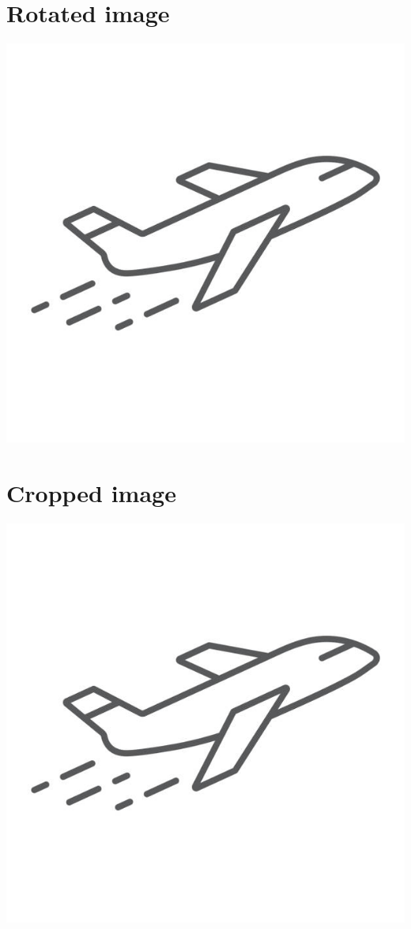 \documentclass{article}
\begin{document}
	\section{Rotated image}
	\includegraphics[angle=180]{plane.jpg} %
	
	
	\section{Cropped image}
	\includegraphics[clip=true, trim=2mm 13mm 1mm 13mm]{plane.jpg}
	
\end{document}
